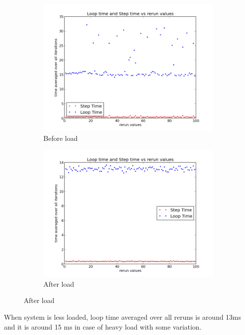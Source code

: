 \documentclass[a4paper,11pt]{article}
\begin{document}
{{\begin{figure}[h]
\centering
\begin{subfigure}{.5\textwidth}
  \centering
  \includegraphics[width=1.0\linewidth]{images/plot3}
  \caption{Before load}
\end{subfigure}%
\begin{subfigure}{.5\textwidth}
  \centering
  \includegraphics[width=1.0\linewidth]{images/plot4}
  \caption{After load}
\end{subfigure}
\end{figure}

\indent When system is less loaded, loop time averaged over all reruns is around 13ms and it is around 15 ms in case of heavy load with some variation. 
}



}
\end{document}
